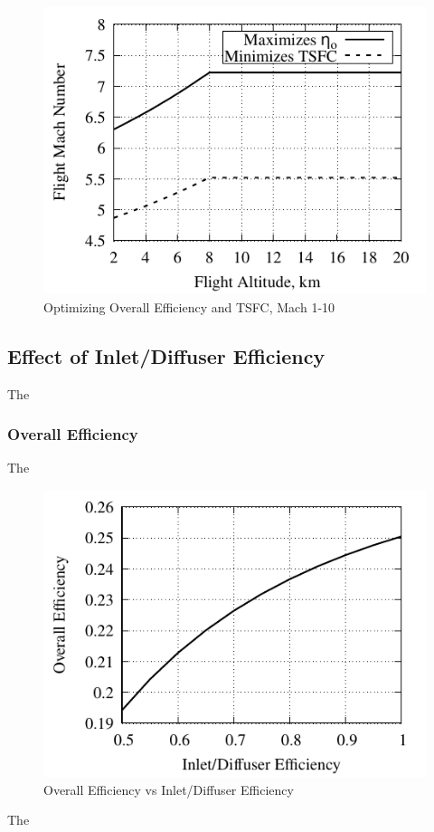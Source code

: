 \documentclass[conf]{new-aiaa} %
\begin{document}
\begin{figure}[H] %
    \centering
    \includegraphics[]{media/performance_parameter_files/part_e_range_1_10.pdf}
    \caption{\label{fig:parte1-10}Optimizing Overall Efficiency and TSFC, Mach 1-10}
\end{figure}

\subsection{Effect of Inlet/Diffuser Efficiency} %
The

\subsubsection{Overall Efficiency}
The

\begin{figure}[H] %
    \centering
    \includegraphics[]{media/performance_parameter_files/part_f_eta_o.pdf}
    \caption{\label{fig:partfetao}Overall Efficiency vs Inlet/Diffuser Efficiency}
\end{figure}
The
\end{document}
